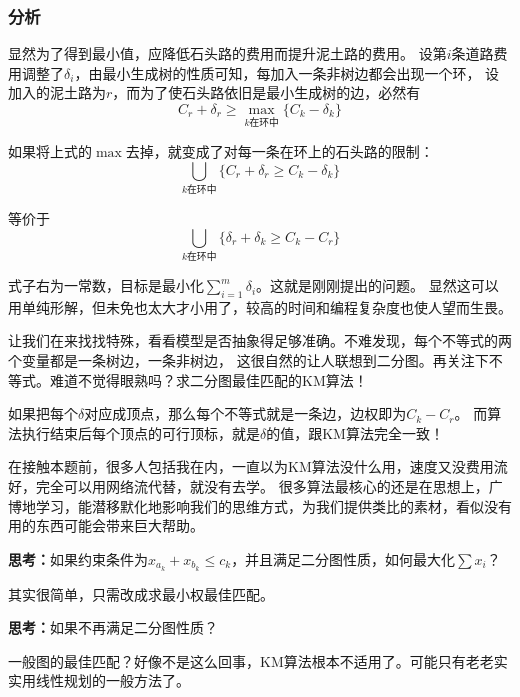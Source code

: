 \subsubsection{分析}
显然为了得到最小值，应降低石头路的费用而提升泥土路的费用。
设第$i$条道路费用调整了$\delta_i$，由最小生成树的性质可知，每加入一条非树边都会出现一个环，
设加入的泥土路为$r$，而为了使石头路依旧是最小生成树的边，必然有
\begin{displaymath}
C_r + \delta_r \ge \max_{k\text{在环中}}\{C_k - \delta_k\}
\end{displaymath}
\par 如果将上式的$\max$去掉，就变成了对每一条在环上的石头路的限制：
\begin{displaymath}
\bigcup_{k\text{在环中}}\{C_r + \delta_r \ge C_k - \delta_k\}
\end{displaymath}
\par 等价于
\begin{displaymath}
\bigcup_{k\text{在环中}}\{\delta_r + \delta_k \ge C_k - C_r\}
\end{displaymath}
\par 式子右为一常数，目标是最小化$\sum_{i = 1}^m \delta_i$。这就是刚刚提出的问题。
显然这可以用单纯形解，但未免也太大才小用了，较高的时间和编程复杂度也使人望而生畏。\par
让我们在来找找特殊，看看模型是否抽象得足够准确。不难发现，每个不等式的两个变量都是一条树边，一条非树边，
这很自然的让人联想到二分图。再关注下不等式。难道不觉得眼熟吗？求二分图最佳匹配的KM算法！\par
如果把每个$\delta$对应成顶点，那么每个不等式就是一条边，边权即为$C_k - C_r$。
而算法执行结束后每个顶点的可行顶标，就是$\delta$的值，跟KM算法完全一致！
\vspace{5pt} \par 在接触本题前，很多人包括我在内，一直以为KM算法没什么用，速度又没费用流好，完全可以用网络流代替，就没有去学。
很多算法最核心的还是在思想上，广博地学习，能潜移默化地影响我们的思维方式，为我们提供类比的素材，看似没有用的东西可能会带来巨大帮助。
\vspace{5pt}\par \textbf{思考：}如果约束条件为$x_{a_k} + x_{b_k} \le c_k$，并且满足二分图性质，如何最大化$\sum{x_i}$？
\par 其实很简单，只需改成求最小权最佳匹配。

\vspace{5pt}\par \textbf{思考：}如果不再满足二分图性质？
\par 一般图的最佳匹配？好像不是这么回事，KM算法根本不适用了。可能只有老老实实用线性规划的一般方法了。

